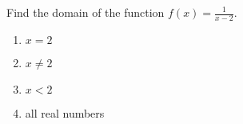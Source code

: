\bigskip

\item  Find the domain of the function $f(x)=\frac{1}{x-2}$.

\begin{enumerate}
\item $x=2$
\item $x\neq 2$
\item $x<2$
\item all real numbers
\end{enumerate}

